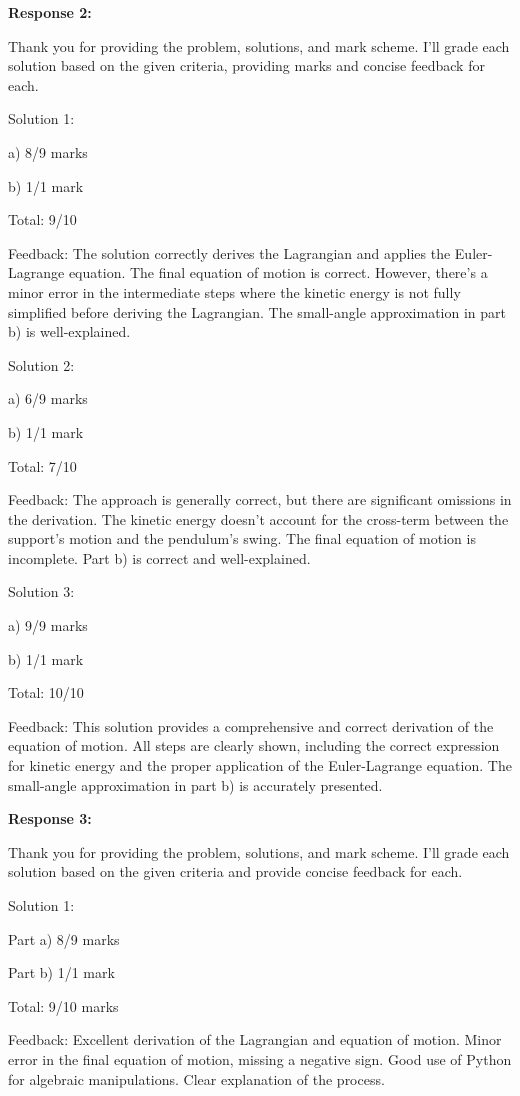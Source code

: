 \documentclass[a4paper,11pt]{article}
\begin{document}
\bigskip
\textbf{Response 2:}

Thank you for providing the problem, solutions, and mark scheme. I'll grade each solution based on the given criteria, providing marks and concise feedback for each.

Solution 1:

a) 8/9 marks

b) 1/1 mark

Total: 9/10

Feedback: The solution correctly derives the Lagrangian and applies the Euler-Lagrange equation. The final equation of motion is correct. However, there's a minor error in the intermediate steps where the kinetic energy is not fully simplified before deriving the Lagrangian. The small-angle approximation in part b) is well-explained.

Solution 2:

a) 6/9 marks

b) 1/1 mark

Total: 7/10

Feedback: The approach is generally correct, but there are significant omissions in the derivation. The kinetic energy doesn't account for the cross-term between the support's motion and the pendulum's swing. The final equation of motion is incomplete. Part b) is correct and well-explained.

Solution 3:

a) 9/9 marks

b) 1/1 mark

Total: 10/10

Feedback: This solution provides a comprehensive and correct derivation of the equation of motion. All steps are clearly shown, including the correct expression for kinetic energy and the proper application of the Euler-Lagrange equation. The small-angle approximation in part b) is accurately presented.

\bigskip
\textbf{Response 3:}

Thank you for providing the problem, solutions, and mark scheme. I'll grade each solution based on the given criteria and provide concise feedback for each.

Solution 1:

Part a) 8/9 marks

Part b) 1/1 mark

Total: 9/10 marks

Feedback: Excellent derivation of the Lagrangian and equation of motion. Minor error in the final equation of motion, missing a negative sign. Good use of Python for algebraic manipulations. Clear explanation of the process.
\end{document}
